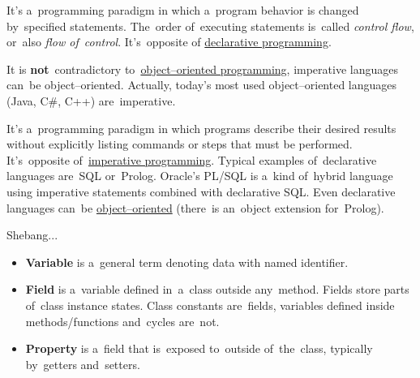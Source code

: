 

\label{imperativeprogramming}
It's a~programming paradigm in which a~program behavior is changed by~specified statements. The~order of~executing statements is~called \textit{control flow}, or~also \textit{flow of~control}. It's~opposite of \hyperref[declarativeprogramming]{declarative programming}.

\warning It is \textbf{not}~contradictory to~\hyperref[objectorientedprogramming]{object--oriented programming}, imperative languages can~be object--oriented. Actually, today's most used object--oriented languages (Java, C\#, C++) are~imperative.

\label{declarativeprogramming}
It's a~programming paradigm in which programs describe their desired results without explicitly listing commands or steps that must be performed. It's~opposite of~\hyperref[imperativeprogramming]{imperative programming}. Typical examples of~declarative languages are~SQL or~Prolog. Oracle's PL/SQL is a~kind of~hybrid language using imperative statements combined with declarative SQL. Even declarative languages can~be \hyperref[objectorientedprogramming]{object--oriented} (there~is an~object extension for~Prolog).

\label{compiledinterpretedlanguages}

\label{scriptinglanguages}
Shebang...

\label{variablefieldproperty}
\begin{itemize}
    \item \textbf{Variable} is a~general term denoting data with named identifier.
    \item \textbf{Field} is a~variable defined in~a~class outside any~method. Fields store parts of~class instance states. Class constants are~fields, variables defined inside \mbox{methods/functions} and~cycles are~not.
    \item \textbf{Property} is a~field that is~exposed to~outside of~the~class, typically by~getters and~setters.
\end{itemize}

